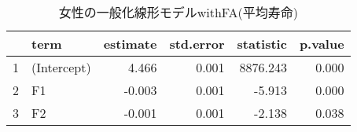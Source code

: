 \begin{table}[ht]
\centering
\begingroup\tiny
\begin{tabular}{rlrrrr}
  \hline
 & term & estimate & std.error & statistic & p.value \\ 
  \hline
1 & (Intercept) & 4.466 & 0.001 & 8876.243 & 0.000 \\ 
  2 & F1 & -0.003 & 0.001 & -5.913 & 0.000 \\ 
  3 & F2 & -0.001 & 0.001 & -2.138 & 0.038 \\ 
   \hline
\end{tabular}
\endgroup
\caption{女性の一般化線形モデルwithFA(平均寿命)} 
\label{table_Gamma_LE_FA_f}
\end{table}
